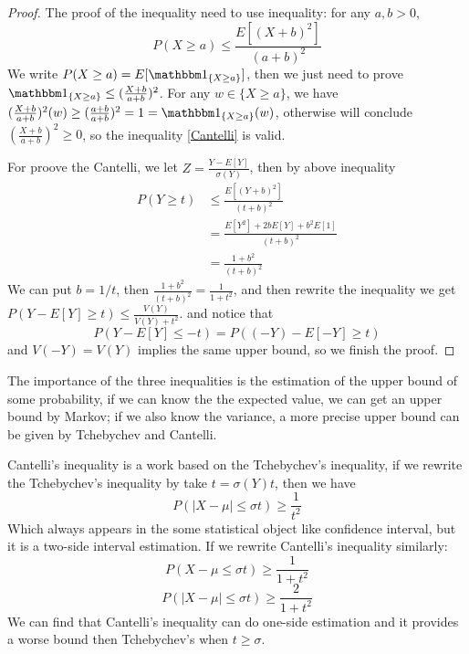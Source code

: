 \documentclass[en,geye,blue,pc,12pt]{elegantnote}
\begin{document}
\begin{proof} 
    The proof of the inequality need to use inequality: for any \(a,b>0\), 
    \begin{equation}
        P(X \geq a) \leq \frac{E[(X+b)^2]}{(a+b)^2}\label{Cantelli}
    \end{equation}
    We write \(P(X \geq a) = E[ \cha_{\{X \geq a\}}]\), then we just need to prove \(\cha_{\{X \geq a\}} \leq (\frac{X+b}{a+b})^2\).
    For any \(w \in \{X \geq a\}\), we have \((\frac{X+b}{a+b})^2(w) \geq (\frac{a+b}{a+b})^2 = 1 =\cha_{\{X \geq a\}}(w)\), otherwise will conclude \((\frac{X+b}{a+b})^2 \geq 0\), so the inequality \ref{Cantelli} is valid.

    For proove the Cantelli, we let \(Z = \frac{Y-E[Y]}{\sigma(Y)}\), then by above inequality
    \begin{align*}
        P(Y \geq t) &\leq \frac{E[(Y+b)^2]}{(t+b)^2} \\
        &= \frac{E[Y^2]+2bE[Y]+b^2E[1]}{(t+b)^2} \\
        &= \frac{1+b^2}{(t+b)^2}
    \end{align*}
    We can put \(b = 1/t\), then \(\frac{1+b^2}{(t+b)^2} = \frac{1}{1+t^2}\), and then rewrite the inequality we get 
    \(P(Y-E[Y] \geq t) \leq \frac{V(Y)}{V(Y)+t^2}\).
    and notice that 
    \[P(Y-E[Y] \leq -t) = P((-Y)-E[-Y] \geq t)\]
    and \(V(-Y)=V(Y)\) implies the same upper bound, so we finish the proof.
\end{proof}

The importance of the three inequalities is the estimation of the upper bound of some probability, if we can know the the expected value, we can get an upper bound by Markov; if we also know the variance, a more precise upper bound can be given by Tchebychev and Cantelli.

Cantelli's inequality is a work based on the Tchebychev's inequality, if we rewrite the Tchebychev's inequality by take \(t = \sigma(Y)t\), then we have
    \[P(|X-\mu|\leq \sigma t) \geq \frac{1}{t^2} \label{eq:Tchebychev}\]
Which always appears in the some statistical object like confidence interval, but it is a two-side interval estimation. If we rewrite Cantelli's inequality similarly:
\[P(X-\mu\leq \sigma t) \geq \frac{1}{1+t^2}\]
\[P(|X-\mu|\leq \sigma t) \geq \frac{2}{1+t^2}\]
We can find that Cantelli's inequality can do one-side estimation and it provides a worse bound then Tchebychev's when \(t \geq \sigma\).
\end{document}
